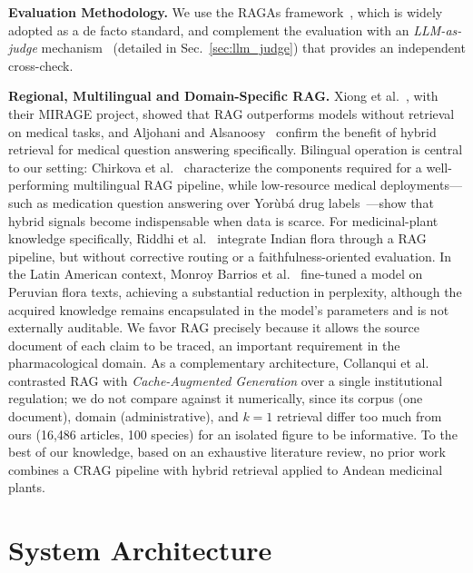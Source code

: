 \documentclass[runningheads]{llncs}
\begin{document}
\textbf{Evaluation Methodology.} We use the RAGAs framework~\cite{es2023ragas}, which is widely adopted as a de facto standard, and complement the evaluation with an \emph{LLM-as-judge} mechanism~\cite{zheng2023mtbench} (detailed in Sec.~\ref{sec:llm_judge}) that provides an independent cross-check.

\textbf{Regional, Multilingual and Domain-Specific RAG.} Xiong et al.~\cite{xiong2024mirage}, with their MIRAGE project, showed that RAG outperforms models without retrieval on medical tasks, and Aljohani and Alsanoosy~\cite{aljohani2026hybridmedical} confirm the benefit of hybrid retrieval for medical question answering specifically. Bilingual operation is central to our setting: Chirkova et al.~\cite{chirkova2024multilingual} characterize the components required for a well-performing multilingual RAG pipeline, while low-resource medical deployments---such as medication question answering over Yor\`ub\'a drug labels~\cite{adebesin2026yoruba}---show that hybrid signals become indispensable when data is scarce. For medicinal-plant knowledge specifically, Riddhi et al.~\cite{riddhi2025indianplants} integrate Indian flora through a RAG pipeline, but without corrective routing or a faithfulness-oriented evaluation. In the Latin American context, Monroy Barrios et al.~\cite{monroy2026finetuning} fine-tuned a model on Peruvian flora texts, achieving a substantial reduction in perplexity, although the acquired knowledge remains encapsulated in the model's parameters and is not externally auditable. We favor RAG precisely because it allows the source document of each claim to be traced, an important requirement in the pharmacological domain. As a complementary architecture, Collanqui et al.~\cite{collanqui2026cagrag} contrasted RAG with \emph{Cache-Augmented Generation} over a single institutional regulation; we do not compare against it numerically, since its corpus (one document), domain (administrative), and $k{=}1$ retrieval differ too much from ours (16{,}486 articles, 100 species) for an isolated figure to be informative. To the best of our knowledge, based on an exhaustive literature review, no prior work combines a CRAG pipeline with hybrid retrieval applied to Andean medicinal plants.

\section{System Architecture}
\label{sec:architecture}
\end{document}
